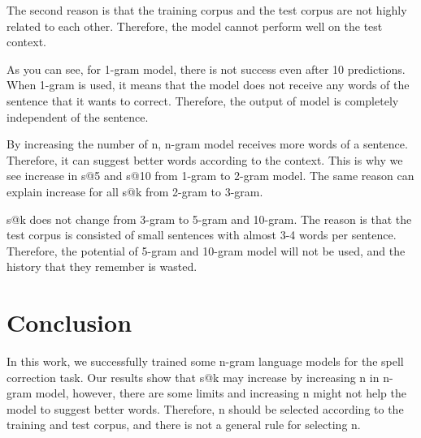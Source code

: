 \documentclass[sigconf]{acmart}
\begin{document}
The second reason is that the training corpus and the test corpus are not highly related to each other. Therefore, the model cannot perform well on the test context. 

As you can see, for 1-gram model, there is not success even after 10 predictions. When 1-gram is used, it means that the model does not receive any words of the sentence that it wants to correct. Therefore, the output of model is completely independent of the sentence. 

By increasing the number of n, n-gram model receives more words of a sentence. Therefore, it can suggest better words according to the context. This is why we see increase in s@5 and s@10 from 1-gram to 2-gram model. The same reason can explain increase for all s@k from 2-gram to 3-gram.

s@k does not change from 3-gram to 5-gram and 10-gram. The reason is that the test corpus is consisted of small sentences with almost 3-4 words per sentence. Therefore, the potential of 5-gram and 10-gram model will not be used, and the history that they remember is wasted.

\section{Conclusion}
In this work, we successfully trained some n-gram language models for the spell correction task. Our results show that s@k may increase by increasing n in n-gram model, however, there are some limits and increasing n might not help the model to suggest better words. Therefore, n should be selected according to the training and test corpus, and there is not a general rule for selecting n. 
% 
%  
\end{document}
